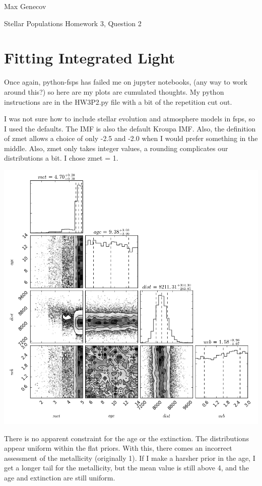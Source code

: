 \documentclass[letterpaper,12pt]{article}
\begin{document}
Max Genecov

\begin{center}
\Large Stellar Populations Homework 3, Question 2
\end{center}

\normalsize


\section{Fitting Integrated Light}

Once again, python-fsps has failed me on jupyter notebooks, (any way to work around this?) so here are my plots are cumulated thoughts. My python instructions are in the HW3P2.py file with a bit of the repetition cut out.

I was not sure how to include stellar evolution and atmosphere models in fsps, so I used the defaults. The IMF is also the default Kroupa IMF. Also, the definition of zmet allows a choice of only -2.5 and -2.0 when I would prefer something in the middle. Also, zmet only takes integer values, a rounding complicates our distributions a bit. I chose zmet = 1.

\includegraphics[width=5.5in]{corner1}

There is no apparent constraint for the age or the extinction. The distributions appear uniform within the flat priors. With this, there comes an incorrect assessment of the metallicity (originally 1). If I make a harsher prior in the age, I get a longer tail for the metallicity, but the mean value is still above 4, and the age and extinction are still uniform.
\end{document}
